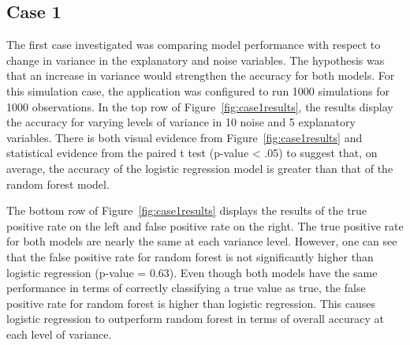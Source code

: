 \documentclass{llncs}
\begin{document}
\subsection{Case 1}
\noindent 
The first case investigated was comparing model performance with respect to change in variance in the explanatory and noise variables. The hypothesis was that an increase in variance would strengthen the accuracy for both models. For this simulation case, the application was configured to run 1000 simulations for 1000 observations. In the top row of Figure~\ref{fig:case1results}, the results display the accuracy for varying levels of variance in 10 noise and 5 explanatory variables. There is both visual evidence from Figure~\ref{fig:case1results} and statistical evidence  from the paired t test (p-value < .05) to suggest that, on average, the accuracy of the logistic regression model is  greater than that of the random forest model. 


\noindent 
The bottom row of Figure~\ref{fig:case1results} displays the results of the true positive rate on the left and false positive rate on the right. The true positive rate for both models are nearly the same at each variance level.  However, one can see that the false positive rate for random forest is not significantly higher than logistic regression (p-value = 0.63).  Even though both models have the same performance in terms of correctly classifying a true value as true, the false positive rate for random forest is higher than logistic regression.  This causes logistic regression to outperform random forest in terms of overall accuracy at each level of variance.
\end{document}
